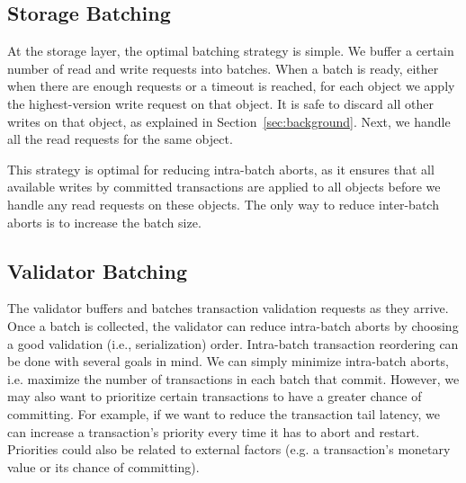 \subsection{Storage Batching}
At the storage layer, the optimal batching strategy is simple. We buffer a certain number of read and write requests into batches. 
When a batch is ready, either when there are enough requests or a timeout is reached, for each object we apply the highest-version write request on that object. It is safe to discard all other writes on that object, as explained in Section~\ref{sec:background}. Next, we handle all the read requests for the same object. 

This strategy is optimal for reducing intra-batch aborts, as it ensures that all available writes by committed transactions are applied to all objects before we handle any read requests on these objects. The only way to reduce inter-batch aborts is to increase the batch size.

\subsection{Validator Batching}\label{subsec:overview:validator}

The validator buffers and batches transaction validation requests as they arrive. 
Once a batch is collected, the validator can reduce intra-batch aborts by choosing a good validation (i.e., serialization) order. 
Intra-batch transaction reordering can be done with several goals in mind. We can simply minimize intra-batch aborts, i.e. maximize the number of transactions in each batch that commit. However, we may also want to prioritize certain transactions to have a greater chance of committing. For example, if we want to reduce the transaction tail latency, we can increase a transaction's priority every time it has to abort and restart. Priorities could also be related to external factors (e.g. a transaction's monetary value or its chance of committing). 

